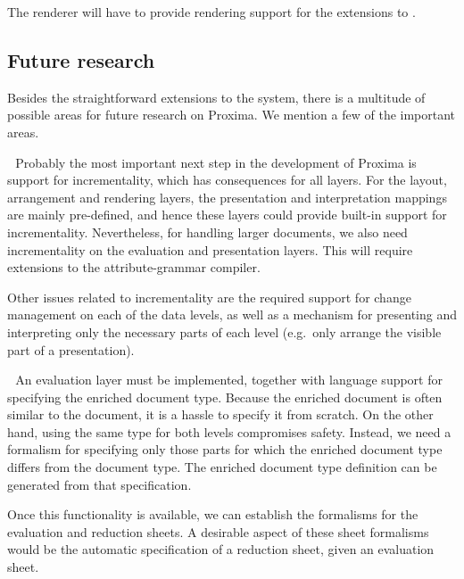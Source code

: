 
The renderer will have to provide rendering support for the extensions to {\Xprez}.

\subsection{Future research}

Besides the straightforward extensions to the system, there is a multitude of possible areas for future research on Proxima. We mention a few of the important areas.

~\,Probably the most important next step in the development of Proxima is support for incrementality, which has consequences for all layers. For the layout, arrangement and rendering layers, the presentation and interpretation mappings are mainly pre-defined, and hence these layers could provide built-in support for incrementality. Nevertheless, for handling larger documents, we also need incrementality on the evaluation and presentation layers. This will require extensions to the attribute-grammar compiler. 


Other issues related to incrementality are the required support for change management on each of the data levels, as well as a mechanism for presenting and interpreting only the necessary parts of each level (e.g.\ only arrange the visible part of a presentation).



~\,An evaluation layer must be implemented, together with language support for specifying the enriched document type. Because the enriched document is often similar to the document, it is a hassle to specify it from scratch. On the other hand, using the same type for both levels compromises safety. Instead, we need a formalism for specifying only those parts for which the enriched document type differs from the document type. The enriched document type definition can be generated from that specification.

Once this functionality is available, we can establish the formalisms for the evaluation and reduction sheets. A desirable aspect of these sheet formalisms would be the automatic specification of a reduction sheet, given an evaluation sheet.

